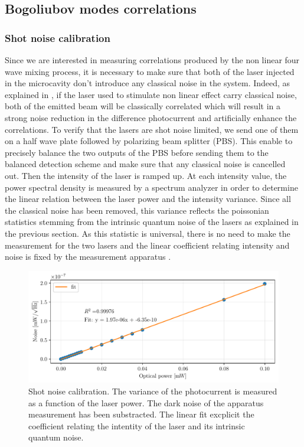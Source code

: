 \subsection{Bogoliubov modes correlations}
\label{sec:exp_corr}


\subsubsection{Shot noise calibration}
Since we are interested in measuring correlations produced by the non linear four wave mixing process, it is necessary to make sure that both of the laser
injected in the microcavity don't introduce any classical noise in the system. Indeed, as explained in \cite{treps_fabre_criteria_2004}, if the laser used to stimulate non linear effect carry classical noise, both of the emitted beam 
will be classically correlated which will result in a strong noise reduction in the difference photocurrent and artificially enhance the correlations.
To verify that the lasers are shot noise limited, we send one of them on a half wave plate followed by polarizing beam splitter (PBS). This enable to precisely balance the two outputs of the PBS before sending them to the balanced detection scheme and make sure 
that any classical noise is cancelled out. Then the intensity of the laser is ramped up. At each intensity value, the power spectral density is measured by a spectrum analyzer in order to determine the linear relation between 
the laser power and the intensity variance. Since all the classical noise has been removed, this variance reflects the poissonian statistics stemming from the intrinsic quantum noise of the lasers as explained in the previous section. As this statistic is universal,
there is no need to make the measurement for the two lasers and the linear coefficient relating intensity and noise is fixed by the measurement apparatus \cite{bachor_guide_1998}.

\begin{figure}
    \centering
    \includegraphics[width=1\textwidth]{chap_correlation/fig/noise_vs_optical_power.pdf}
    \caption{Shot noise calibration. The variance of the photocurrent is measured as a function of the laser power. The dark noise of the apparatus measurement has been substracted. The linear fit excplicit the coefficient relating the intentity of the laser and its intrinsic quantum noise.}
    \label{fig:calibration}
\end{figure}

